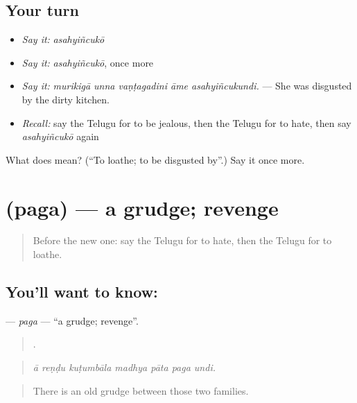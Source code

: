 \subsection*{Your turn}
\begin{itemize}
\raggedright
  \item \emph{Say it:} \emph{asahyiñcukō}
  \item \emph{Say it:} \emph{asahyiñcukō}, once more
  \item \emph{Say it:} \emph{murikigā unna vaṇṭagadini āme asahyiñcukundi.} — She was disgusted by the dirty kitchen.
  \item \emph{Recall:} say the Telugu for to be jealous, then the Telugu for to hate, then say \emph{asahyiñcukō} again
\end{itemize}

\begin{tcolorbox}[breakable,colback=teal!4,colframe=teal!35!black,title={Before you move on}]
What does  mean? (\textquotedblleft{}To loathe; to be disgusted by\textquotedblright{}.) Say it once more.
\end{tcolorbox}
\section[\texorpdfstring{\te{పగ} (paga)}{పగ (paga)}]{ (paga) — a grudge; revenge}

\label{lesson:TE-C499-paga}



\begin{quote}
Before the new one: say the Telugu for to hate, then the Telugu for to loathe.
\end{quote}

\subsection*{You'll want to know: }
\textbf{} — \emph{paga} — \textquotedblleft{}a grudge; revenge\textquotedblright{}.

\begin{quote}
      .
\end{quote}

\begin{quote}
\emph{ā reṇḍu kuṭumbāla madhya pāta paga undi.}
\end{quote}

\begin{quote}
There is an old grudge between those two families.
\end{quote}


